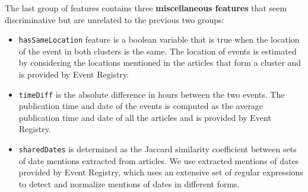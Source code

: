The last group of features contains three {\bf miscellaneous features} that seem 
discriminative but are unrelated to the previous two groups:
\begin{itemize}
\item \texttt{hasSameLocation} feature is a boolean variable that is true when the location of the event 
in both clusters is the same. The location of events is estimated by considering the locations mentioned 
in the articles that form a cluster and is provided by Event Registry.
\item \texttt{timeDiff} is the absolute difference in hours between the two events. The publication time 
and date of the events is computed as the average publication time and date of all the articles and is 
provided by Event Registry.
\item \texttt{sharedDates} is determined as the Jaccard similarity coefficient between sets of date 
mentions extracted from articles. We use extracted mentions of dates provided by Event Registry, which 
uses an extensive set of regular expressions to detect and normalize mentions of dates in different forms.
\end{itemize}

